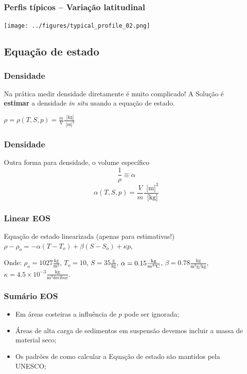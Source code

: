 \begin{frame}
\frametitle{Perfis típicos -- Variação latitudinal}
    \begin{center}
        \texttt{[image: ../figures/typical\_profile\_02.png]}
    \end{center}
\end{frame}

\subsection{Equação de estado}
\begin{frame}
\frametitle{Densidade}
    \begin{block}{}
        Na prática medir densidade diretamente é muito complicado!
        A Solução é {\bf estimar} a densidade {\it in situ} usando a equação de estado.
    \end{block}
    \pause
    \begin{center}
        $\rho = \rho(T, S, p) = \frac{m}{V}\frac{\text{ [kg]}}{\text{ [m]}^3} $
    \end{center}
\end{frame}


\begin{frame}
\frametitle{Densidade}
    \begin{block}{Outra forma para densidade, o volume específico}
            $$\frac{1}{\rho} \equiv \alpha$$
            $$\alpha(T, S, p) = \frac{V}{m}\frac{\text{ [m]}^3}{\text{ [kg]}} $$
    \end{block}
\end{frame}


\begin{frame}
\frametitle{Linear EOS}
    \begin{block}{}
      Equação de estado linearizada (apenas para estimativas!)
      $\rho - \rho_o = -\alpha(T - T_o) + \beta(S - S_o) + \kappa p$,
    \end{block}
    \vspace{0.3cm}
    Onde:
    \pause
    $\rho_o = 1027 \frac{\text{kg}}{{\text{m}}^3}$,
    $T_o = 10$\textcelsius,
    $S = 35 \frac{\text{g}}{\text{kg}}$,
    $\alpha = 0.15 \frac{\text{kg}}{\text{m}^3\text{\textcelsius}}$,
    $\beta = 0.78 \frac{\text{kg}}{\text{m}^3\text{g/kg}}$,
    $\kappa = 4.5 \times 10^{-3} \frac{\text{kg}}{\text{m}^3\text{decibar}}$.
\end{frame}

\begin{frame}
\frametitle{Sumário EOS}
  \begin{itemize}[<+-| alert@+>]
    \item Em áreas costeiras a influência de $p$ pode ser ignorada;
    \item Áreas de alta carga de sedimentos em suspensão devemos incluir a
          massa de material seco;
    \item Os padrões de como calcular a Equação de estado são mantidos pela
          UNESCO;
  \end{itemize}
\end{frame}


